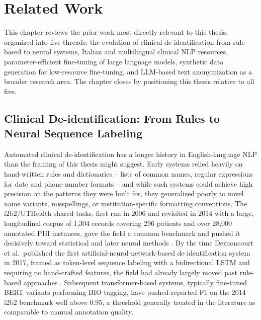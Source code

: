 \documentclass[12pt,a4paper]{report}
\begin{document}
\chapter{Related Work}
\label{ch:related}

This chapter reviews the prior work most directly relevant to this thesis, organized into five threads: the evolution of clinical de-identification from rule-based to neural systems, Italian and multilingual clinical NLP resources, parameter-efficient fine-tuning of large language models, synthetic data generation for low-resource fine-tuning, and LLM-based text anonymization as a broader research area. The chapter closes by positioning this thesis relative to all five.

\section{Clinical De-identification: From Rules to Neural Sequence Labeling}

Automated clinical de-identification has a longer history in English-language NLP than the framing of this thesis might suggest. Early systems relied heavily on hand-written rules and dictionaries -- lists of common names, regular expressions for date and phone-number formats -- and while such systems could achieve high precision on the patterns they were built for, they generalized poorly to novel name variants, misspellings, or institution-specific formatting conventions. The i2b2/UTHealth shared tasks, first run in 2006 and revisited in 2014 with a large, longitudinal corpus of 1,304 records covering 296 patients and over 28,000 annotated PHI instances, gave the field a common benchmark and pushed it decisively toward statistical and later neural methods \citep{stubbs2015automated}. By the time Dernoncourt et al.\ published the first artificial-neural-network-based de-identification system in 2017, framed as token-level sequence labeling with a bidirectional LSTM and requiring no hand-crafted features, the field had already largely moved past rule-based approaches \citep{dernoncourt2017deidentification}. Subsequent transformer-based systems, typically fine-tuned BERT variants performing BIO tagging, have pushed reported F1 on the 2014 i2b2 benchmark well above 0.95, a threshold generally treated in the literature as comparable to manual annotation quality.
\end{document}
